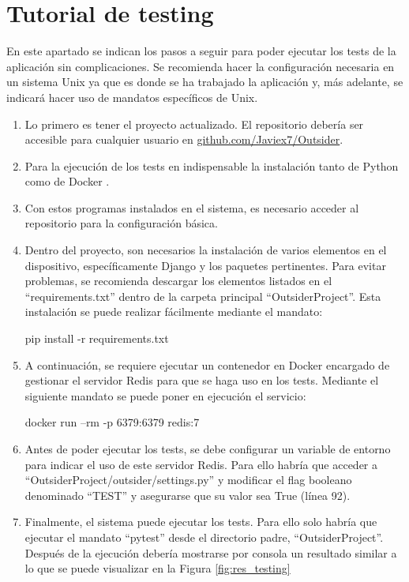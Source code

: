 \section{Tutorial de testing}
\label{sect:testing}

En este apartado se indican los pasos a seguir para poder ejecutar los tests de la aplicación sin complicaciones. Se recomienda hacer
la configuración necesaria en un sistema Unix ya que es donde se ha trabajado la aplicación y, más adelante, se indicará hacer uso de mandatos 
específicos de Unix.

\begin{enumerate}
	\item Lo primero es tener el proyecto actualizado. El repositorio debería ser accesible para cualquier usuario en 
            \href{https://github.com/Javiex7/Outsider}{github.com/Javiex7/Outsider}.
	\item Para la ejecución de los tests en indispensable la instalación tanto de Python \cite{installPython} como de Docker \cite{installDocker}.
	\item Con estos programas instalados en el sistema, es necesario acceder al repositorio para la configuración básica.
	\item Dentro del proyecto, son necesarios la instalación de varios elementos en el dispositivo, específicamente Django y los paquetes
	      pertinentes. Para evitar problemas, se recomienda descargar los elementos listados en el ``requirements.txt'' dentro de la carpeta principal
	      ``OutsiderProject''. Esta instalación se puede realizar fácilmente mediante el mandato: 
	      	                
	      pip install -r requirements.txt
	      	      
	\item A continuación, se requiere ejecutar un contenedor en Docker encargado de gestionar el servidor Redis para
	      que se haga uso en los tests. Mediante el siguiente mandato se puede poner en ejecución el servicio:
	      	      
	      docker run --rm -p 6379:6379 redis:7
	      	      
	\item Antes de poder ejecutar los tests, se debe configurar un variable de entorno para indicar el uso de 
	      este servidor Redis. Para ello habría que acceder a ``OutsiderProject/outsider/settings.py'' y modificar
	      el flag booleano denominado ``TEST'' y asegurarse que su valor sea True (línea 92).
	      	      
	\item Finalmente, el sistema puede ejecutar los tests. Para ello solo habría que ejecutar el mandato ``pytest''
	      desde el directorio padre, ``OutsiderProject''. Después de la ejecución debería mostrarse por consola
	      un resultado similar a lo que se puede visualizar en la Figura \ref{fig:res_testing}
	      	         
\end{enumerate}	

